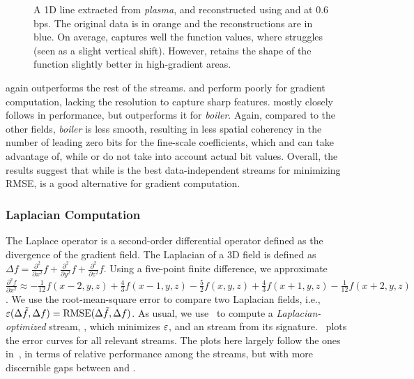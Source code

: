 \begin{figure}[!b]
\centering
{}
 \caption{A 1D
line extracted from \emph{plasma}, and reconstructed using \sbit and \swav at 0.6 bps. The original
data is in orange and the reconstructions are in blue. On average, \swav captures well the function
values, where \sbit struggles (seen as a slight vertical shift). However, \sbit retains the shape of the function slightly better in
high-gradient areas.}
\label{fig:bit-plane-vs-wavelet-norm-gradient}
\vspace{-1em}
\end{figure}

\sgop again outperforms the rest of the streams. \slvl and \smag perform poorly for gradient
computation, lacking the resolution to capture sharp features. \sgsg mostly closely follows \sbit in
performance, but outperforms it for \emph{boiler}. Again, compared to the other fields,
\emph{boiler} is less smooth, resulting in less spatial coherency in the number of leading zero bits
for the fine-scale coefficients, which \sgop and \sgsg can take advantage of, while \swav or \sbit
do not take into account actual bit values. Overall, the results suggest that while \swav is the
best data-independent streams for minimizing RMSE, \sbit is a good alternative for gradient
computation.

\subsubsection{Laplacian Computation}\label{sec:laplacian}

The Laplace operator is a second-order differential operator defined as the divergence of the
gradient field. The Laplacian of a 3D field is defined as $\Delta f = 
\frac{{\partial}^2}{\partial{x^2}}f+\frac{{\partial}^2}{\partial{y^2}}f+\frac{{\partial}^2}{\partial{z^2}}f$.
%
Using a five-point finite difference, we approximate 
$\frac{{\partial}^2 f}{\partial{x^2}}
\approx
-\frac{1}{12}f(x-2,y,z)+\frac{4}{3}f(x-1,y,z)-\frac{5}{2}f(x,y,z)+\frac{4}{3}f(x+1,y,z)-\frac{1}{12}f(x+2,y,z)$.
We use the root-mean-square error to compare two Laplacian fields, i.e., $\err(\Delta
\tilde{f},\Delta f)=\text{RMSE}(\Delta \tilde{f},\Delta f)$. As usual, we use~ to
compute a \emph{Laplacian-optimized} stream, \slop, which minimizes $\err$, and an \slsg stream from
its signature.~ plots the error curves for all relevant
streams. The plots here largely follow the ones in~, in terms of
relative performance among the streams, but with more discernible gaps between \sbit and \slsg.



